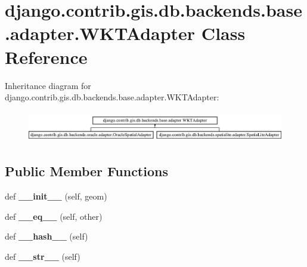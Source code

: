 \hypertarget{classdjango_1_1contrib_1_1gis_1_1db_1_1backends_1_1base_1_1adapter_1_1_w_k_t_adapter}{}\section{django.\+contrib.\+gis.\+db.\+backends.\+base.\+adapter.\+W\+K\+T\+Adapter Class Reference}
\label{classdjango_1_1contrib_1_1gis_1_1db_1_1backends_1_1base_1_1adapter_1_1_w_k_t_adapter}
Inheritance diagram for django.\+contrib.\+gis.\+db.\+backends.\+base.\+adapter.\+W\+K\+T\+Adapter\+:\begin{figure}[H]
\begin{center}
\leavevmode
\includegraphics[height=1.365854cm]{classdjango_1_1contrib_1_1gis_1_1db_1_1backends_1_1base_1_1adapter_1_1_w_k_t_adapter}
\end{center}
\end{figure}
\subsection*{Public Member Functions}
\begin{DoxyCompactItemize}
\item 
\mbox{\label{classdjango_1_1contrib_1_1gis_1_1db_1_1backends_1_1base_1_1adapter_1_1_w_k_t_adapter_a0f7682397c3fc7e8f5efdd995550188f}} 
def {\bfseries \+\_\+\+\_\+init\+\_\+\+\_\+} (self, geom)
\item 
\mbox{\label{classdjango_1_1contrib_1_1gis_1_1db_1_1backends_1_1base_1_1adapter_1_1_w_k_t_adapter_aa895797a190b852be0c83f893da9fd5c}} 
def {\bfseries \+\_\+\+\_\+eq\+\_\+\+\_\+} (self, other)
\item 
\mbox{\label{classdjango_1_1contrib_1_1gis_1_1db_1_1backends_1_1base_1_1adapter_1_1_w_k_t_adapter_afdebb145243182bd12b5ab1317dbb02f}} 
def {\bfseries \+\_\+\+\_\+hash\+\_\+\+\_\+} (self)
\item 
\mbox{\label{classdjango_1_1contrib_1_1gis_1_1db_1_1backends_1_1base_1_1adapter_1_1_w_k_t_adapter_a4116fc50fc992aaeab55f1e6fc561a65}} 
def {\bfseries \+\_\+\+\_\+str\+\_\+\+\_\+} (self)
\end{DoxyCompactItemize}
